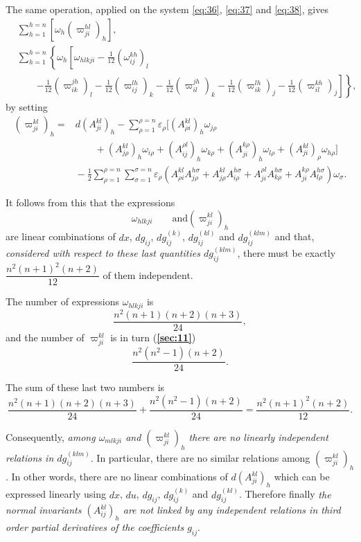 \documentclass[leqno,12pt]{article}
\makeatletter
\let\old@epsilon\epsilon
\let\old@varepsilon\varepsilon
\let\epsilon\old@varepsilon
\let\varepsilon\old@epsilon
\theoremstyle{shape1}
\theoremstyle{shape0}
\theoremstyle{shape2}
\theoremstyle{definition}
\makeatother
\begin{document}
The same operation, applied on the system \eqref{eq:36}, \eqref{eq:37} and \eqref{eq:38}, gives
\begin{align*}
  &\sum_{h=1}^{h=n}[\omega_{h}(\varpi_{ji}^{hl})_{h}],\\
  &\sum_{h=1}^{h=n}\left\{\omega_{h}\left[\omega_{hlkji}-\frac{1}{12}(\omega^{kh}_{ij})_{l}\right.\right.\\
  &\qquad \left.\left.-\frac{1}{12}(\varpi^{jh}_{ik})_{l}-\frac{1}{12}(\varpi^{lh}_{ij})_{k}-\frac{1}{12}(\varpi^{jh}_{il})_{k}-\frac{1}{12}(\varpi^{lh}_{ik})_{j}-\frac{1}{12}(\varpi^{kh}_{il})_{j}\right]\right\},
\end{align*}
by setting
\begin{align*}
  (\varpi^{kl}_{ji})_{h}=&{}d(A^{kl}_{ji})_{h}-\sum_{\rho=1}^{\rho=n}\epsilon_{\rho}[(A^{kl}_{\rho i})_{h}\omega_{j \rho}\\
  &\qquad +(A^{kl}_{j\rho})_{h}\omega_{i \rho}+
  (A^{\rho l}_{ij})_{h}\omega_{k \rho}+
  (A^{k\rho}_{ji})_{h}\omega_{l \rho}+
  (A^{kl}_{ji})_{\rho}\omega_{h \rho}]\\
  &{}-\frac{1}{2}\sum_{\rho=1}^{\rho=n}\sum_{\sigma=1}^{\sigma=n}\epsilon_{\rho}(A^{kl}_{\rho i}A^{h\sigma}_{j\rho}+A^{kl}_{j\rho}A^{h\sigma}_{i\rho}+A^{\rho l}_{ji}A^{h\sigma}_{k\rho}+A^{k\rho}_{ji}A^{h\sigma}_{l\rho})\omega_{\sigma}.
\end{align*}

It follows from this that the expressions
\[
\omega_{hlkji}\qquad\text{and}(\varpi^{kl}_{ji})_{h}
\]
are linear combinations of $dx$, $dg_{ij}$, $dg_{ij}^{(k)}$, $dg_{ij}^{(kl)}$ and $dg_{ij}^{(klm)}$ and that, \emph{considered with respect to these last quantities $dg_{ij}^{(klm)}$}, there must be exactly $\dfrac{n^{2}(n+1)^{2}(n+2)}{12}$ of them independent.

The number of expressions $\omega_{hlkji}$ is 
\[
\frac{n^{2}(n+1)(n+2)(n+3)}{24},
\]
and the number of $\varpi^{kl}_{ji}$ is in turn (\textsection\textbf{\ref{sec:11}})
\[
\frac{n^{2}(n^{2}-1)(n+2)}{24}.
\]

The sum of these last two numbers is
\[
\frac{n^{2}(n+1)(n+2)(n+3)}{24}
+\frac{n^{2}(n^{2}-1)(n+2)}{24}
=\frac{n^{2}(n+1)^{2}(n+2)}{12}.
\]

Consequently, \emph{among $\omega_{mlkji}$ and $(\varpi^{kl}_{ji})_{h}$ there are no linearly independent relations in $dg_{ij}^{(klm)}$}. In particular, there are no similar relations among $(\varpi^{kl}_{ji})_{h}$. In other words, there are no linear combinations of $d(A^{kl}_{ji})_{h}$ which can be expressed linearly using $dx$, $du$, $dg_{ij}$, $dg_{ij}^{(k)}$ and $dg_{ij}^{(kl)}$. Therefore finally \emph{the normal invariants $(A^{kl}_{ij})_{h}$ are not linked by any independent relations in third order partial derivatives of the coefficients  $g_{ij}$}.
\end{document}
